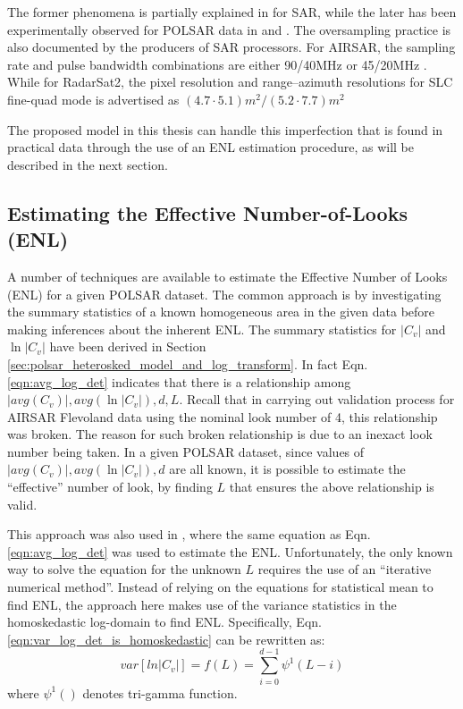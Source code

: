 The former phenomena is partially explained in \cite{Raney_1988_TGRS_666} for SAR,
  while the later has been experimentally observed for POLSAR data in \cite{Lee_1994_TGRS_1017} and \cite{Anfinsen_2009_TGRS_3795}.
The oversampling practice is also documented by the producers of SAR processors.
For AIRSAR, the sampling rate and pulse bandwidth combinations are either 90/40MHz or 45/20MHz \cite{JPL_2013_Web_AIRSAR_Impl}.
While for RadarSat2, the pixel resolution and range--azimuth resolutions for SLC fine-quad mode is advertised as $(4.7 \cdot 5.1)m^2/(5.2 \cdot 7.7)m^2$ \cite{MDA_2013_Web_RadatSat2_Description}


The proposed model in this thesis can handle this imperfection that is found in practical data through the use of an ENL estimation procedure, as will be described in the next section.
  
\subsection{Estimating the Effective Number-of-Looks (ENL)}

A number of techniques are available to estimate the Effective Number of Looks (ENL) for a given POLSAR dataset.
The common approach is by investigating the summary statistics of a known homogeneous area in the given data
  before making inferences about the inherent ENL.
The summary statistics for $|C_v|$ and $\ln|C_v|$ have been derived in Section \ref{sec:polsar_heterosked_model_and_log_transform}.
In fact Eqn. \ref{eqn:avg_log_det} indicates that there is a relationship among $|avg(C_v)|,avg(\ln|C_v|),d,L$.
Recall that in carrying out validation process for AIRSAR Flevoland data using the nominal look number of 4, this relationship was broken.
The reason for such broken relationship is due to an inexact look number being taken.
In a given POLSAR dataset, since values of $|avg(C_v)|,avg(\ln|C_v|),d$ are all known,
  it is possible to estimate the ``effective'' number of look, by finding $L$ that ensures the above relationship is valid.

This approach was also used in \cite{Anfinsen_2009_TGRS_3795}, where the same equation 
  as Eqn.  \ref{eqn:avg_log_det} was used to estimate the ENL.
Unfortunately, the only known way to solve the equation for the unknown $L$ requires the use of an ``iterative numerical method''.
Instead of relying on the equations for statistical mean to find ENL,
  the approach here makes use of the variance statistics in the homoskedastic log-domain to find ENL.
Specifically, Eqn. \ref{eqn:var_log_det_is_homoskedastic} can be rewritten as: 
\begin{equation}
  var \left[ ln|C_v| \right] = f(L) = \sum^{d-1}_{i=0} \psi^1(L-i)
\end{equation}
where $\psi^1()$ denotes tri-gamma function.

